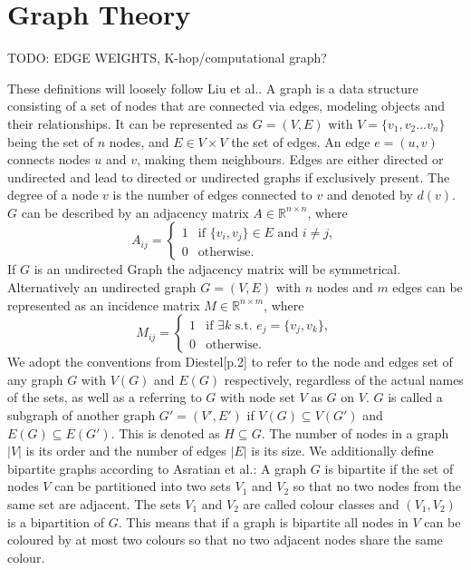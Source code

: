\section{Graph Theory}
TODO: EDGE WEIGHTS, K-hop/computational graph? \bigskip

These definitions will loosely follow Liu et al.\cite{Liu2020}. A graph is a data structure consisting of a set of nodes that are connected via edges, modeling objects and their relationships. It can be represented as $G=(V,E)$ with $V=\{v_1,v_2...v_n\}$ being the set of $n$ nodes, and $E \in V \times V$ the set of edges. An edge $e=(u,v)$ connects nodes $u$ and $v$, making them neighbours. Edges are either directed or undirected and lead to directed or undirected graphs if exclusively present. The degree of a node $v$ is the number of edges connected to $v$ and denoted by $d(v)$. $G$ can be described by an adjacency matrix $A \in \mathbb{R}^{n \times n}$, where
\begin{equation*}
    A_{ij}=\begin{cases}
        1 & \text{if } \{v_i,v_j\}\in E \text{ and } i \neq j, \\
        0 & \text{otherwise.}
    \end{cases}
\end{equation*}
If $G$ is an undirected Graph the adjacency matrix will be symmetrical. \\
Alternatively an undirected graph $ G=(V, E)$ with $n$ nodes and $m$ edges can be represented as an incidence matrix $M \in \mathbb{R}^{n \times m}$, where
\begin{equation*}
    M_{ij}=\begin{cases}
        1 & \text{if } \exists k \text{ s.t. } e_j = \{v_j, v_k\}, \\
        0 & \text{otherwise.}
    \end{cases}
\end{equation*}
We adopt the conventions from Diestel\cite{Diestel2017}[p.2] to refer to the node and edges set of any graph $G$ with $V(G)$ and $E(G)$ respectively, regardless of the actual names of the sets, as well as a referring to $G$ with node set $V$ as $G$ on $V$. $G$ is called a subgraph of another graph $G'=(V',E')$ if $V(G) \subseteq V(G')$ and $E(G) \subseteq E(G')$. This is denoted as $H \subseteq G$. The number of nodes in a graph $|V|$ is its order and the number of edges $|E|$ is its size.
We additionally define bipartite graphs according to Asratian et al.\cite{asratian1998}: A graph $G$ is bipartite if the set of nodes $V$ can be partitioned into two sets $V_1$ and $V_2$ so that no two nodes from the same set are adjacent. The sets $V_1$ and $V_2$ are called colour classes and $(V_1, V_2)$ is a bipartition of $G$. This means that if a graph is bipartite all nodes in $V$ can be coloured by at most two colours so that no two adjacent nodes share the same colour.\\
